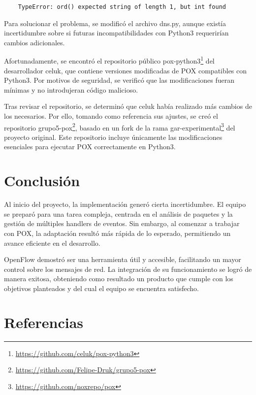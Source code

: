 \begin{verbatim}
    TypeError: ord() expected string of length 1, but int found
\end{verbatim}

Para solucionar el problema, se modificó el archivo dns.py, aunque existía incertidumbre sobre si futuras incompatibilidades con Python3 requerirían cambios adicionales.

Afortunadamente, se encontró el repositorio público pox-python3\footnote{\url{https://github.com/celuk/pox-python3}} del desarrollador celuk, que contiene versiones modificadas de POX compatibles con Python3. Por motivos de seguridad, se verificó que las modificaciones fueran mínimas y no introdujeran código malicioso.

Tras revisar el repositorio, se determinó que celuk había realizado más cambios de los necesarios. Por ello, tomando como referencia sus ajustes, se creó el repositorio grupo5-pox\footnote{\url{https://github.com/Felipe-Druk/grupo5-pox}}, basado en un fork de la rama gar-experimental\footnote{\url{https://github.com/noxrepo/pox}} del proyecto original. Este repositorio incluye únicamente las modificaciones esenciales para ejecutar POX correctamente en Python3.

\vspace{0.25 cm}


\section{Conclusión}

Al inicio del proyecto, la implementación generó cierta incertidumbre. El equipo se preparó para una tarea compleja, centrada en el análisis de paquetes y la gestión de múltiples handlers de eventos. Sin embargo, al comenzar a trabajar con POX, la adaptación resultó más rápida de lo esperado, permitiendo un avance eficiente en el desarrollo.

OpenFlow demostró ser una herramienta útil y accesible, facilitando un mayor control sobre los mensajes de red. La integración de su funcionamiento se logró de manera exitosa, obteniendo como resultado un producto que cumple con los objetivos planteados y del cual el equipo se encuentra satisfecho.

\section{Referencias}

